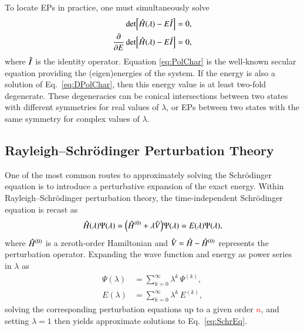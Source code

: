 \documentclass[aps,prb,reprint,noshowkeys,superscriptaddress]{revtex4-1}
\newcommand{\titou}[1]{\textcolor{red}{#1}}
\newcommand{\hI}{\Hat{I}}
\newcommand{\hH}{\Hat{H}}
\newcommand{\hV}{\Hat{V}}
\begin{document}
To locate EPs in practice, one must simultaneously solve
\begin{subequations}
\begin{align}
	\label{eq:PolChar}
	\det[\hH(\lambda) - E \hI] & = 0,
	\\ 
	\label{eq:DPolChar}
	\pdv{E}\det[\hH(\lambda) - E \hI] & = 0,
\end{align}
\end{subequations}
where $\hI$ is the identity operator.\cite{Cejnar_2007}
Equation \eqref{eq:PolChar} is the well-known secular equation providing the (eigen)energies of the system. 
If the energy is also a solution of Eq.~\eqref{eq:DPolChar}, then this energy value is at least two-fold degenerate. 
These degeneracies can be conical intersections between two states with different symmetries 
for real values of $\lambda$,\cite{Yarkony_1996} or EPs between two states with the 
same symmetry for complex values of $\lambda$.


\subsection{Rayleigh--Schr\"odinger Perturbation Theory}

One of the most common routes to approximately solving the Schr\"odinger equation
is to introduce a perturbative expansion of the exact energy.
Within Rayleigh--Schr\"odinger perturbation theory, the time-independent Schr\"odinger equation 
is recast as 
\begin{equation} 
	\hH(\lambda) \Psi(\lambda) 
    = \qty(\hH^{(0)} + \lambda \hV ) \Psi(\lambda) 
    = E(\lambda) \Psi(\lambda),
    \label{eq:SchrEq-PT}
\end{equation}
where $\hH^{(0)}$ is a zeroth-order Hamiltonian and $\hV = \hH - \hH^{(0)}$ represents the perturbation operator.
Expanding the wave function and energy as power series in $\lambda$ as 
\begin{subequations}
\begin{align}
    \Psi(\lambda) &= \sum_{k=0}^{\infty} \lambda^{k}\,\Psi^{(k)},
    \label{eq:psi_expansion}
    \\
    E(\lambda) &= \sum_{k=0}^{\infty} \lambda^{k}\,E^{(k)},
    \label{eq:E_expansion}
\end{align}
\end{subequations}
solving the corresponding perturbation equations up to a given order \titou{$n$}, and
setting $\lambda = 1$ then yields approximate solutions to Eq.~\eqref{eq:SchrEq}.
\end{document}
